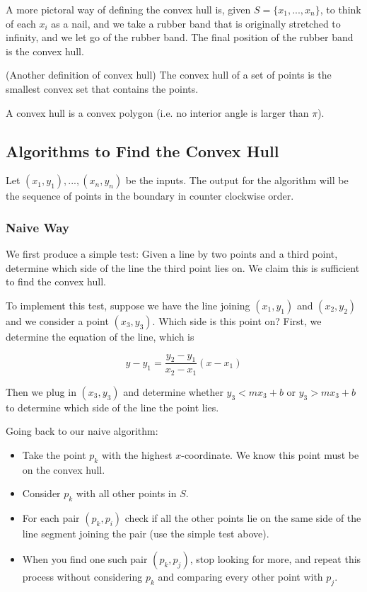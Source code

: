 A more pictoral way of defining the convex hull is, given
$S = \{ x_1, ..., x_n \}$, to think of each $x_i$ as a nail, and
we take a rubber band that is originally stretched to infinity, and we
let go of the rubber band. The final position of the rubber band is
the convex hull.

\begin{definition}
    (Another definition of convex hull) The convex hull of a set of
    points is the smallest convex set that
    contains the points.
\end{definition}

\begin{lemma}
    A convex hull is a convex polygon (i.e. no interior angle is
    larger than $\pi$).
\end{lemma}


\subsection{Algorithms to Find the Convex Hull}

Let $(x_1, y_1), ..., (x_n, y_n)$ be the inputs. The output for the
algorithm will be the sequence of points in the boundary in counter
clockwise order.

\subsubsection{Naive Way}

We first produce a simple test: Given a line
by two points and a third point, determine which side of the line the
third point lies on. We claim this is sufficient to find the convex
hull.

To implement this test, suppose we have the line joining $(x_1, y_1)$
and $(x_2, y_2)$ and we consider a point $(x_3, y_3)$. Which side is
this
point on? First, we determine the equation of the line, which is

$$
y - y_1 = \frac{y_2 - y_1}{x_2 - x_1}(x - x_1)
$$

Then we plug in $(x_3, y_3)$ and determine whether $y_3 < mx_3 + b$
or $y_3 > mx_3 + b$ to determine which side of the line the point
lies.

Going back to our naive algorithm:

\begin{itemize}
    \item Take the point $p_k$ with the highest $x$-coordinate. We
    know this
    point must be on the convex hull.
    \item Consider $p_k$ with all other points in $S$.
    \item For each pair $(p_k, p_i)$ check if all the other points lie
    on the same
    side of the line segment joining the pair (use the simple test
    above).
    \item When you find one such pair $(p_k, p_j)$, stop looking for
    more, and repeat this process without considering $p_k$ and
    comparing every other point with $p_j$.
\end{itemize}


